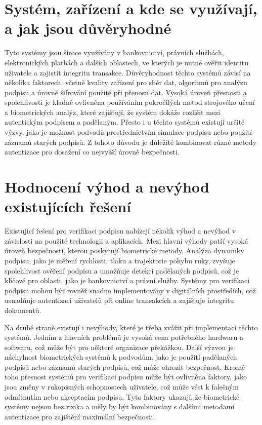 \section{Systém, zařízení a kde se využívají, a jak jsou důvěryhodné}
Tyto systémy jsou široce využívány v bankovnictví, právních službách, elektronických platbách a dalších oblastech, ve kterých je nutné ověřit identitu uživatele a zajistit integritu transakce.%
Důvěryhodnost těchto systémů závisí na několika faktorech, včetně kvality zařízení pro sběr dat, algoritmů pro analýzu podpisu a úrovně šifrování použité při přenosu dat. %
Vysoká úroveň přesnosti a spolehlivosti je kladně ovlivněna používáním pokročilých metod strojového učení a biometrických analýz, které zajišťují, že systém dokáže rozlišit mezi autentickým podpisem a padělaným. %
Přesto i u těchto systémů existují určité výzvy, jako je možnost podvodů prostřednictvím simulace podpisu nebo použití záznamů starých podpisů. %
Z tohoto důvodu je důležité kombinovat různé metody autentizace pro dosažení co nejvyšší úrovně bezpečnosti. %

\section{Hodnocení výhod a nevýhod existujících řešení}
Existující řešení pro verifikaci podpisu nabízejí několik výhod a nevýhod v závislosti na použité technologii a aplikacích. %
Mezi hlavní výhody patří vysoká úroveň bezpečnosti, kterou poskytují biometrické metody.%
Analýza dynamiky podpisu, jako je měření rychlosti, tlaku a trajektorie pohybu ruky, zvyšuje spolehlivost ověření podpisu a umožňuje detekci padělaných podpisů, což je klíčové pro oblasti, jako je bankovnictví a právní služby. %
Systémy pro verifikaci podpisu mohou být rovněž snadno implementovány v digitálních prostředích, což usnadňuje autentizaci uživatelů při online transakcích a zajišťuje integritu dokumentů.%

Na druhé straně existují i nevýhody, které je třeba zvážit při implementaci těchto systémů. %
Jedním z hlavních problémů je vysoká cena potřebného hardwaru a softwaru, což může být pro některé organizace překážkou. %
Další výzvou je náchylnost biometrických systémů k podvodům, jako je použití padělaných podpisů nebo záznamů starých podpisů, což může ohrozit bezpečnost. %
Kromě toho přesnost systémů pro verifikaci podpisu může být ovlivněna faktory, jako jsou změny v rukopisných schopnostech uživatele, což může vést k falešným odmítnutím nebo akceptacím podpisu. %
Tyto faktory ukazují, že biometrické systémy nejsou bez rizika a měly by být kombinovány s dalšími metodami autentizace pro zajištění maximální bezpečnosti.%


